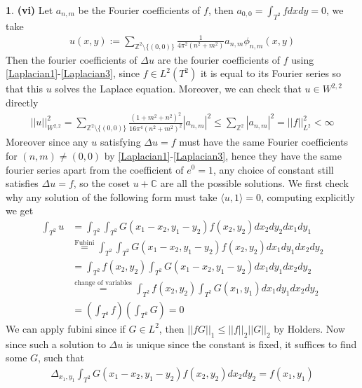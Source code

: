 \documentclass[10.5pt]{article}
\theoremstyle{definition}
\newtheorem{pb}{}
\newcommand{\set}[1]{\{#1\}}
\newcommand{\gen}[1]{\langle#1\rangle}
\newcommand{\abs}[1]{\left\vert#1\right\vert}
\newcommand{\norm}[1]{\lvert\lvert#1\rvert\rvert}
\begin{document}
\begin{pb}
        \textbf{(vi)} Let \(a_{n,m}\) be the Fourier coefficients of \(f\), then \(a_{0,0} = \int_{T^2} fdxdy = 0\), we take 
        \begin{align}
            u(x,y) := \sum_{\mathbb{Z}^2 \setminus \set{(0,0)}}\frac{1}{4\pi^2(n^2 + m^2)} a_{n,m} \phi_{n,m}(x,y) \label{definvlap}
        \end{align}
        Then the fourier coefficients of \(\Delta u\) are the fourier coefficients of \(f\) using \eqref{Laplacian1}-\eqref{Laplacian3}, since \(f \in L^2(T^2)\) it is equal to its Fourier series so that this \(u\) solves the Laplace equation. Moreover, we can check that \(u \in W^{2,2}\) directly
        \begin{align*}
            \norm{u}_{W^{2,2}}^2 = \sum_{\mathbb{Z}^2 \setminus \set{(0,0)}} \frac{(1 + m^2 + n^2)^2}{16\pi^4(n^2 + m^2)^2} \abs{a_{n,m}}^2 \leq \sum_{\mathbb{Z}^2} \abs{a_{n,m}}^2 = \norm{f}_{L^2}^2 < \infty
        \end{align*}
        Moreover since any \(u\) satisfying \(\Delta u = f\) must have the same Fourier coefficients for \((n,m) \neq (0,0)\) by \eqref{Laplacian1}-\eqref{Laplacian3}, hence they have the same fourier series apart from the coefficient of \(e^0 = 1\), any choice of constant still satisfies \(\Delta u = f\), so the coset \(u + \mathbb{C}\) are all the possible solutions. We first check why any solution of the following form must take \(\gen{u,1} = 0\), computing explicitly we get
        \begin{align}
            \int_{T^2} u &= \int_{T^2}\int_{T^2} G(x_1-x_2,y_1-y_2)f(x_2,y_2)dx_2dy_2dx_1dy_1 \\ 
            &\overset{\text{Fubini}}{=} \int_{T^2}\int_{T^2} G(x_1-x_2,y_1-y_2)f(x_2,y_2)dx_1dy_1dx_2dy_2 \\
            &= \int_{T^2}f(x_2,y_2)\int_{T^2}G(x_1-x_2,y_1-y_2)dx_1dy_1dx_2dy_2 \\
            &\overset{\text{change of variables}}{=} \int_{T^2}f(x_2,y_2)\int_{T^2}G(x_1,y_1)dx_1dy_1dx_2dy_2 \\
            &= \left(\int_{T^2} f\right)\left(\int_{T^2} G\right) = 0
        \end{align}
        We can apply fubini since if \(G \in L^2\), then \(\norm{fG}_1 \leq \norm{f}_2 \norm{G}_2\) by Holders. Now since such a solution to \(\Delta u\) is unique since the constant is fixed, it suffices to find some \(G\), such that
        \begin{align}
            \Delta_{x_1,y_1} \int_{T^2} G(x_1-x_2,y_1-y_2)f(x_2,y_2)dx_2dy_2 = f(x_1,y_1) \label{desiderata}

\end{align}
\end{pb}
\end{document}
